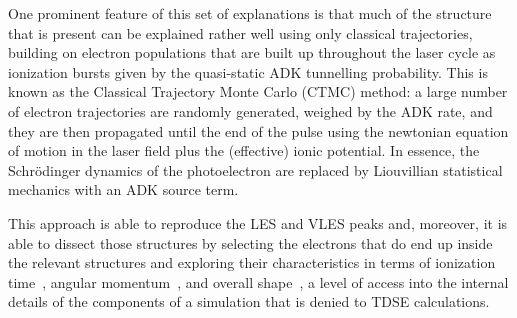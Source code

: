 
One prominent feature of this set of explanations is that much of the structure that is present can be explained rather well using only classical trajectories, building on electron populations that are built up throughout the laser cycle as ionization bursts given by the quasi-static ADK tunnelling probability. This is known as the Classical Trajectory Monte Carlo (CTMC) method: a large number of electron trajectories are randomly generated, weighed by the ADK rate, and they are then propagated until the end of the pulse using the newtonian equation of motion in the laser field plus the (effective) ionic potential. In essence, the Schrödinger dynamics of the photoelectron are replaced by Liouvillian statistical mechanics with an ADK source term.

This approach is able to reproduce the LES and VLES peaks \cite{CTMC1, CTMC2, zhi_Coulomb-LES_2014, lemell_lowenergy_2012} and, moreover, it is able to dissect those structures by selecting the electrons that do end up inside the relevant structures and exploring their characteristics in terms of ionization time~\cite{VLES_characterization, zhi_Coulomb-LES_2014}, angular momentum~\cite{lemell_lowenergy_2012, lemell_classicalquantum_2013}, and overall shape~\cite{lemell_classicalquantum_2013, xia_near-zero-energy_2015}, a level of access into the internal details of the components of a simulation that is denied to TDSE calculations.



